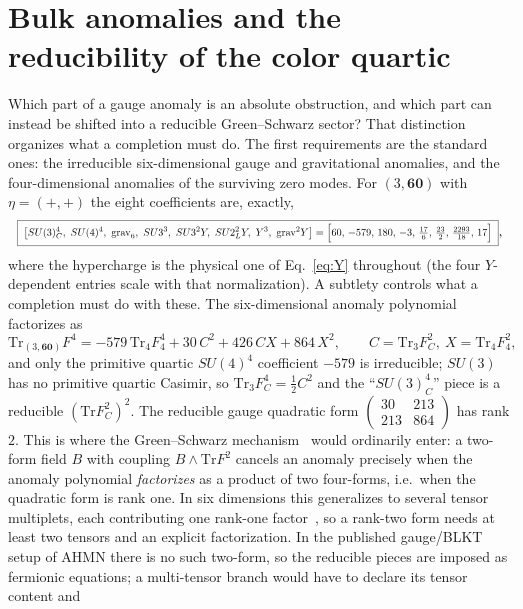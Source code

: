 \documentclass[11pt,a4paper]{article}
\newcommand{\Tr}{\mathrm{Tr}}
\begin{document}
\section{Bulk anomalies and the reducibility of the color quartic}\label{sec:bulkanom}
Which part of a gauge anomaly is an absolute obstruction, and which part can instead be
shifted into a reducible Green--Schwarz sector? That distinction organizes what a
completion must do. The first requirements are the standard ones: the irreducible
six-dimensional gauge and gravitational anomalies, and the four-dimensional anomalies of
the surviving zero modes. For $(3,\mathbf{60})$ with $\eta=(+,+)$ the eight coefficients
are, exactly,
\begin{equation}
\resizebox{\textwidth}{!}{$\displaystyle
\boxed{\;\big[SU(3)_C^4,\ SU(4)^4,\ \mathrm{grav}_6,\ SU3^3,\ SU3^2Y,\ SU2_L^2Y,\ Y^3,\
\mathrm{grav}^2Y\big]=\Big[60,\,-579,\,180,\,-3,\,\tfrac{17}{6},\,\tfrac{23}{2},\,\tfrac{2293}{18},\,17\Big]\;}$},
\end{equation}
where the hypercharge is the physical one of Eq.~\eqref{eq:Y} throughout (the four
$Y$-dependent entries scale with that normalization). A subtlety controls what a
completion must do with these. The six-dimensional anomaly
polynomial factorizes as
\begin{equation}
\Tr_{(3,\mathbf{60})}F^4=-579\,\Tr_4 F_4^4+30\,C^2+426\,CX+864\,X^2,
\qquad C=\Tr_3 F_C^2,\ X=\Tr_4 F_4^2,
\end{equation}
and only the primitive quartic $SU(4)^4$ coefficient $-579$ is irreducible; $SU(3)$ has
no primitive quartic Casimir, so $\Tr_3 F_C^4=\tfrac12 C^2$ and the ``$SU(3)_C^4$''
piece is a reducible $(\Tr F_C^2)^2$. The reducible gauge quadratic form
$\left(\begin{smallmatrix}30&213\\213&864\end{smallmatrix}\right)$ has rank $2$. This is
where the Green--Schwarz mechanism~\cite{GreenSchwarz} would ordinarily enter: a
two-form field $B$ with coupling $B\wedge\Tr F^2$ cancels an anomaly precisely when the
anomaly polynomial \emph{factorizes} as a product of two four-forms, i.e.\ when the
quadratic form is rank one. In six dimensions this generalizes to several tensor
multiplets, each contributing one rank-one factor~\cite{Sagnotti}, so a rank-two form
needs at least two tensors and an explicit factorization. In the published gauge/BLKT
setup of AHMN there is no such two-form, so the reducible pieces are imposed as
fermionic equations; a multi-tensor branch would have to declare its tensor content and
\end{document}
